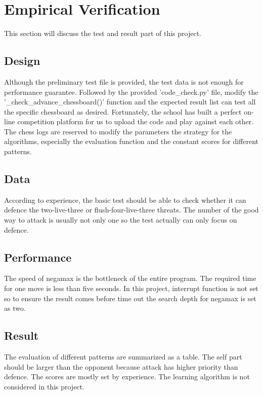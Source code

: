 \documentclass[9pt,shortpaper,twoside,web]{ieeecolor}
\begin{document}
 
\section{Empirical Verification}
This section will discuss the test and result part of this project.

\subsection{Design}
Although the preliminary test file is provided, the test data is not enough for performance guarantee. Followed by the provided 'code\_check.py' file, modify the '\_check\_advance\_chessboard()' function and the expected result list can test all the specific chessboard as desired.
Fortunately, the school has built a perfect on-line competition platform for us to upload the code and play against each other. The chess logs are reserved to modify the parameters the strategy for the algorithms, especially the evaluation function and the constant scores for different patterns.

\subsection{Data}
According to experience, the basic test should be able to check whether it can defence the two-live-three or flush-four-live-three threats. The number of the good way to attack is usually not only one so the test actually can only focus on defence.  
\subsection{Performance}
The speed of negamax is the bottleneck of the entire program. The required time for one move is less than five seconds. In this project, interrupt function is not set so to ensure the result comes before time out the search depth for negamax is set as two.
\subsection{Result}
The evaluation of different patterns are summarized as a table. The self part should be larger than the opponent because attack has higher priority than defence. The scores are mostly set by experience. The learning algorithm is not considered in this project.
\end{document}
